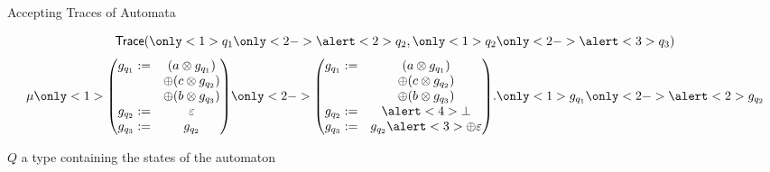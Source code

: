\documentclass[10pt]{beamer}
\begin{document}
\begin{frame}{Accepting Traces of Automata}
    \begin{minipage}{.5\textwidth}
      \[ \mathsf{Trace}(\only<1>{q_{1}}\only<2->{\alert<2> {q_{2}}}, \only<1>{q_{2}}\only<2->{\alert<3>{q_{3}}}) \]
      \begin{equation*}
        \mu
        \only<1>{
        \begin{pmatrix}
          g_{q_{1}} := & (a \otimes g_{q_{1}}) \\ & \oplus  ( c \otimes g_{q_{2}} ) \\ & \oplus (b \otimes g_{q_{3}}) \\
          g_{q_{2}} := & \varepsilon \\
          g_{q_{3}} := & g_{q_{2}} \\
        \end{pmatrix}}\only<2->{
        \begin{pmatrix}
          g_{q_{1}} := & (a \otimes g_{q_{1}}) \\ & \oplus  ( c \otimes g_{q_{2}} ) \\ & \oplus (b \otimes g_{q_{3}}) \\
          g_{q_{2}} := & \alert<4>{\bot} \\
          g_{q_{3}} := & g_{q_{2}} \alert<3>{\oplus \varepsilon} \\
        \end{pmatrix}
        }. \only<1>{g_{q_{1}}}\only<2->{\alert<2>{g_{q_{2}}}}
      \end{equation*}
    \end{minipage}%
    \begin{minipage}{.5\textwidth}
      $Q$ a type containing the states of the automaton


\end{minipage}
\end{frame}
\end{document}
